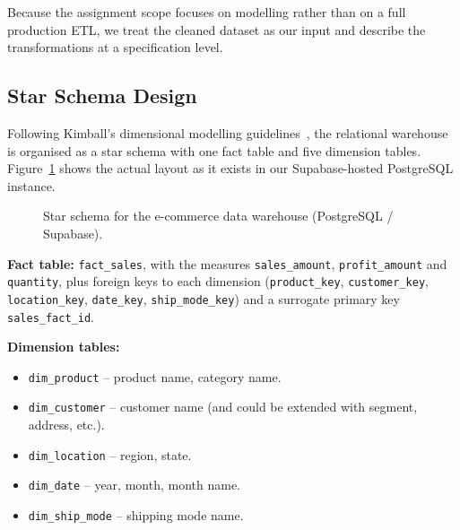 \documentclass[11pt,a4paper]{article}
\begin{document}
Because the assignment scope focuses on modelling rather than on a full
production ETL, we treat the cleaned dataset as our input and describe the
transformations at a specification level.

\subsection{Star Schema Design}\label{sec:star-schema}

Following Kimball's dimensional modelling
guidelines~\cite{kimball2013toolkit}, the relational warehouse is
organised as a star schema with one fact table and five dimension tables.
Figure~\ref{fig:star-schema} shows the actual layout as it exists in our
Supabase-hosted PostgreSQL instance.

\begin{figure}[H]
\centering
\caption{Star schema for the e-commerce data warehouse (PostgreSQL / Supabase).}
\label{fig:star-schema}
\end{figure}

\textbf{Fact table:} \texttt{fact\_sales}, with the measures
\texttt{sales\_amount}, \texttt{profit\_amount} and \texttt{quantity}, plus
foreign keys to each dimension (\texttt{product\_key},
\texttt{customer\_key}, \texttt{location\_key}, \texttt{date\_key},
\texttt{ship\_mode\_key}) and a surrogate primary key
\texttt{sales\_fact\_id}.

\textbf{Dimension tables:}
\begin{itemize}[leftmargin=*]
    \item \texttt{dim\_product} -- product name, category name.
    \item \texttt{dim\_customer} -- customer name (and could be extended
          with segment, address, etc.).
    \item \texttt{dim\_location} -- region, state.
    \item \texttt{dim\_date} -- year, month, month name.
    \item \texttt{dim\_ship\_mode} -- shipping mode name.
\end{itemize}
\end{document}
